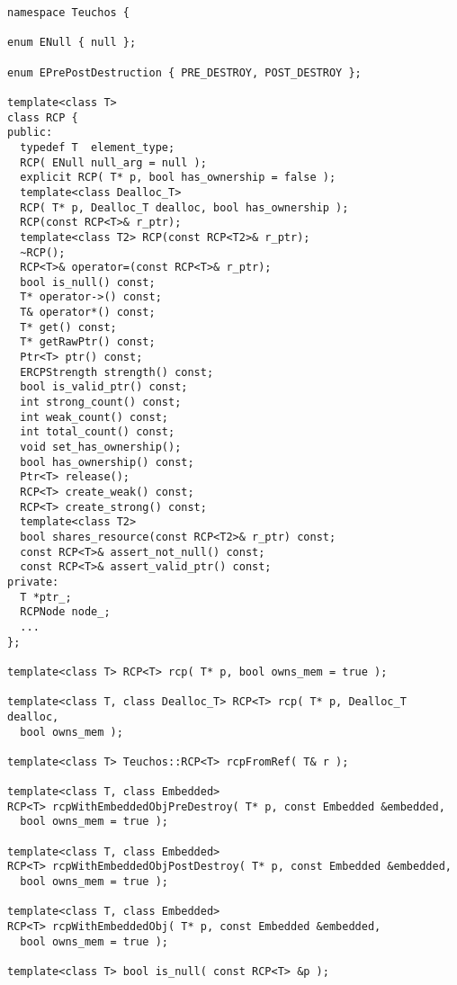 \documentclass[pdf,ps2pdf,11pt]{SANDreport}
\begin{document}
{\scriptsize\begin{verbatim}
namespace Teuchos {

enum ENull { null };

enum EPrePostDestruction { PRE_DESTROY, POST_DESTROY };

template<class T>
class RCP {
public:
  typedef T  element_type;
  RCP( ENull null_arg = null );
  explicit RCP( T* p, bool has_ownership = false );
  template<class Dealloc_T>
  RCP( T* p, Dealloc_T dealloc, bool has_ownership );
  RCP(const RCP<T>& r_ptr);
  template<class T2> RCP(const RCP<T2>& r_ptr);
  ~RCP();
  RCP<T>& operator=(const RCP<T>& r_ptr);
  bool is_null() const;
  T* operator->() const;
  T& operator*() const;
  T* get() const;
  T* getRawPtr() const;
  Ptr<T> ptr() const;
  ERCPStrength strength() const;
  bool is_valid_ptr() const;
  int strong_count() const;
  int weak_count() const;
  int total_count() const;
  void set_has_ownership();
  bool has_ownership() const;
  Ptr<T> release();
  RCP<T> create_weak() const;
  RCP<T> create_strong() const;
  template<class T2>
  bool shares_resource(const RCP<T2>& r_ptr) const;
  const RCP<T>& assert_not_null() const;
  const RCP<T>& assert_valid_ptr() const;
private:
  T *ptr_;
  RCPNode node_;
  ...
};

template<class T> RCP<T> rcp( T* p, bool owns_mem = true );

template<class T, class Dealloc_T> RCP<T> rcp( T* p, Dealloc_T dealloc,
  bool owns_mem );

template<class T> Teuchos::RCP<T> rcpFromRef( T& r );

template<class T, class Embedded>
RCP<T> rcpWithEmbeddedObjPreDestroy( T* p, const Embedded &embedded,
  bool owns_mem = true );

template<class T, class Embedded>
RCP<T> rcpWithEmbeddedObjPostDestroy( T* p, const Embedded &embedded,
  bool owns_mem = true );

template<class T, class Embedded>
RCP<T> rcpWithEmbeddedObj( T* p, const Embedded &embedded,
  bool owns_mem = true );

template<class T> bool is_null( const RCP<T> &p );
\end{verbatim}}
\pagebreak
\end{document}

